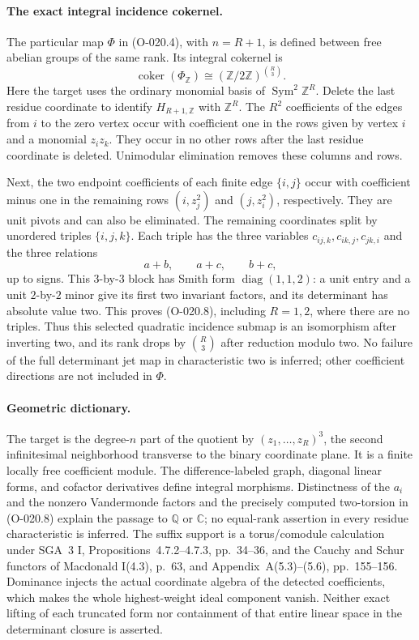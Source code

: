 \paragraph{The exact integral incidence cokernel.}
The particular map $\Phi$ in (O-020.4), with $n=R+1$,
is defined between free abelian groups of the same rank.
Its integral cokernel is
\[
          \operatorname{coker}(\Phi_{\mathbb Z})
                      \cong(\mathbb Z/2\mathbb Z)^{\binom R3}.
                                                               \tag{O-020.8}
\]
Here the target uses the ordinary monomial basis of
$\operatorname{Sym}^2\mathbb Z^R$. Delete the last residue
coordinate to identify $H_{R+1,\mathbb Z}$ with $\mathbb Z^R$.
The $R^2$ coefficients of the edges from $i$ to the zero
vertex occur with coefficient one in the rows given by
vertex $i$ and a monomial $z_i z_k$. They occur in no
other rows after the last residue coordinate is deleted.
Unimodular elimination removes these columns and rows.

Next, the two endpoint coefficients of each finite edge
$\{i,j\}$ occur with coefficient minus one in the remaining
rows $(i,z_j^2)$ and $(j,z_i^2)$, respectively.
They are unit pivots and can also be eliminated.
The remaining coordinates split by unordered triples
$\{i,j,k\}$. Each triple has the three variables
$c_{ij,k},c_{ik,j},c_{jk,i}$ and the three relations
\[
             a+b,\qquad a+c,\qquad b+c,
\]
up to signs. This $3$-by-$3$ block has Smith form
$\operatorname{diag}(1,1,2)$: a unit entry and a unit
$2$-by-$2$ minor give its first two invariant factors,
and its determinant has absolute value two. This proves
(O-020.8), including $R=1,2$, where there are no triples.
Thus this selected quadratic incidence submap is an
isomorphism after inverting two, and its rank drops by
$\binom R3$ after reduction modulo two.
No failure of the full determinant jet map in characteristic
two is inferred; other coefficient directions are not
included in $\Phi$.

\paragraph{Geometric dictionary.}
The target is the degree-$n$ part of the quotient by
$(z_1,\ldots,z_R)^3$, the second infinitesimal neighborhood
transverse to the binary coordinate plane. It is a finite
locally free coefficient module. The difference-labeled graph, diagonal
linear forms, and cofactor derivatives define integral
morphisms. Distinctness of the $a_i$ and the nonzero
Vandermonde factors and the precisely computed two-torsion
in (O-020.8) explain the passage to
$\mathbb Q$ or $\mathbb C$; no equal-rank assertion in
every residue characteristic is inferred.
The suffix support is a torus/comodule calculation under
SGA~3 I, Propositions~4.7.2--4.7.3, pp.~34--36,
and the Cauchy and Schur functors of Macdonald I(4.3),
p.~63, and Appendix~A(5.3)--(5.6), pp.~155--156.
Dominance injects the actual coordinate algebra of the
detected coefficients, which makes the whole highest-weight
ideal component vanish. Neither exact lifting of each
truncated form nor containment of that entire linear space
in the determinant closure is asserted.
